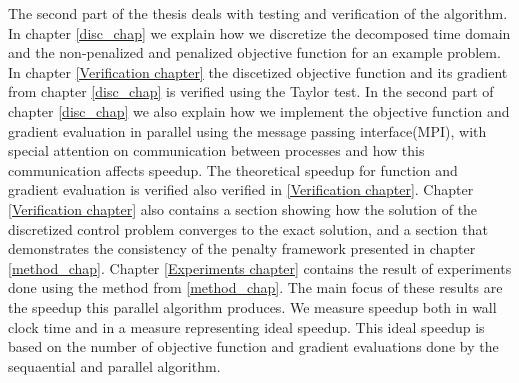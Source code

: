 The second part of the thesis deals with testing and verification of the algorithm. In chapter \ref{disc_chap} we explain how we discretize the decomposed time domain and the non-penalized and penalized objective function for an example problem. In chapter \ref{Verification chapter} the discetized objective function and its gradient from chapter \ref{disc_chap} is verified using the Taylor test. In the second part of chapter \ref{disc_chap} we also explain how we implement the objective function and gradient evaluation in parallel using the message passing interface(MPI), with special attention on communication between processes and how this communication affects speedup. The theoretical speedup for function and gradient evaluation is verified also verified in \ref{Verification chapter}. Chapter \ref{Verification chapter} also contains a section showing how the solution of the discretized control problem converges to the exact solution, and a section that demonstrates the consistency of the penalty framework presented in chapter \ref{method_chap}. Chapter \ref{Experiments chapter} contains the result of experiments done using the method from \ref{method_chap}. The main focus of these results are the speedup this parallel algorithm produces. We measure speedup both in wall clock time and in a measure representing ideal speedup. This ideal speedup is based on the number of objective function and gradient evaluations done by the sequaential and parallel algorithm.